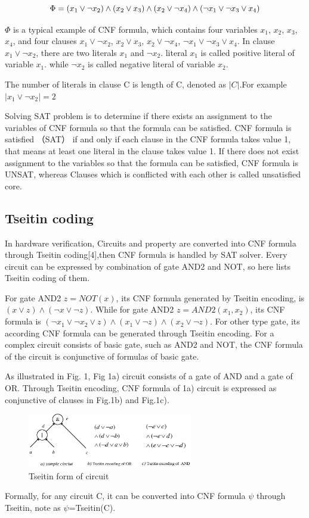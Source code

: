 \documentclass[runningheads,a4paper]{llncs}
\begin{document}
\begin{equation}
\centering \Phi=(x_1\vee \neg x_2)\wedge(x_2\vee x_3)\wedge(x_2\vee \neg x_4)\wedge( \neg x_1\vee \neg x_3\vee x_4)
\end{equation}

$\Phi$ is a typical example of CNF formula, which contains four variables $x_1$, $x_2$, $x_3$, $x_4$, 
and four clauses $x_1\vee \neg x_2$, $x_2\vee x_3$, $x_2\vee \neg x_4$, $ \neg x_1\vee \neg x_3\vee x_4$.
In clause $x_1\vee \neg x_2$, there are two literals $x_1$ and $ \neg x_2$.
literal $x_1$ is called positive literal of variable $x_1$.
while $ \neg x_2$ is called negative literal of variable $x_2$.

The number of literals in clause C is length of C, denoted as $|C|$.For example $| x_1\vee  \neg x_2 | =2$

Solving SAT problem is to determine if there exists an assignment to the variables of CNF formula so that the formula can be satisfied. 
CNF formula is satisfied （SAT） if and only if each clause in the CNF formula takes value 1, that means at least one literal in the clause takes value 1.
If there does not exist assignment to the variables so that the formula can be satisfied, CNF formula is UNSAT, whereas Clauses which is conflicted with each other is called unsatisfied core.
\subsection{Tseitin coding}

In hardware verification, Circuits and property are converted into CNF formula through Tseitin coding[4],then CNF formula is handled by SAT solver. 
Every circuit can be expressed by combination of gate AND2 and NOT, so here lists Tseitin coding of them. 

For gate AND2  $z=NOT(x)$, its CNF formula generated by Tseitin encoding, is  $(x\vee z)\wedge( \neg x\vee \neg z)$.
While for gate AND2 $z=AND2(x_1,x_2)$, its CNF formula is $( \neg x_1\vee \neg x_2\vee z)\wedge(x_1\vee \neg z) \wedge(x_2\vee \neg z)$.
For other type gate, its according CNF formula can be generated through Tseitin encoding.
For a complex circuit consists of basic gate, such as AND2 and NOT, the CNF formula of the circuit is conjunctive of formulas of basic gate.

As illustrated in Fig. 1, Fig 1a) circuit consists of a gate of AND and a gate of OR.
Through Tseitin encoding, CNF formula of 1a) circuit  is expressed as conjunctive of clauses in Fig.1b) and Fig.1c).
\begin{figure}
\centering
\includegraphics[width=7.2cm]{a1}
\caption{Tseitin form of circuit}
\end{figure}
Formally, for any circuit C, it can be converted into CNF formula $\psi$ through Tseitin, note as $\psi$=Tseitin(C).
\end{document}
